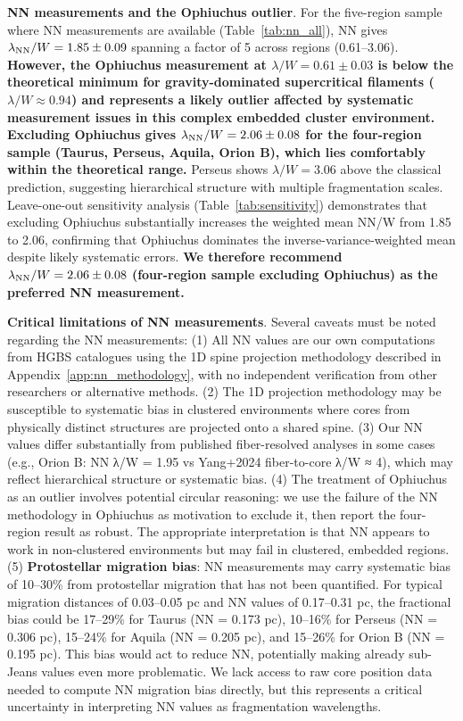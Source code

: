 \documentclass[twoside,twocolumn]{mnras}
\begin{document}
\textbf{NN measurements and the Ophiuchus outlier}. For the five-region sample where NN measurements are available (Table~\ref{tab:nn_all}), NN gives $\lambda_{\rm NN}/W = 1.85 \pm 0.09$ spanning a factor of 5 across regions (0.61--3.06). \textbf{However, the Ophiuchus measurement at $\lambda/W = 0.61 \pm 0.03$ is below the theoretical minimum for gravity-dominated supercritical filaments ($\lambda/W \approx 0.94$) and represents a likely outlier affected by systematic measurement issues in this complex embedded cluster environment. Excluding Ophiuchus gives $\lambda_{\rm NN}/W = 2.06 \pm 0.08$ for the four-region sample (Taurus, Perseus, Aquila, Orion B), which lies comfortably within the theoretical range.} Perseus shows $\lambda/W = 3.06$ above the classical prediction, suggesting hierarchical structure with multiple fragmentation scales. Leave-one-out sensitivity analysis (Table~\ref{tab:sensitivity}) demonstrates that excluding Ophiuchus substantially increases the weighted mean NN/W from 1.85 to 2.06, confirming that Ophiuchus dominates the inverse-variance-weighted mean despite likely systematic errors. \textbf{We therefore recommend $\lambda_{\rm NN}/W = 2.06 \pm 0.08$ (four-region sample excluding Ophiuchus) as the preferred NN measurement.}

\textbf{Critical limitations of NN measurements}. Several caveats must be noted regarding the NN measurements: (1) All NN values are our own computations from HGBS catalogues using the 1D spine projection methodology described in Appendix~\ref{app:nn_methodology}, with no independent verification from other researchers or alternative methods. (2) The 1D projection methodology may be susceptible to systematic bias in clustered environments where cores from physically distinct structures are projected onto a shared spine. (3) Our NN values differ substantially from published fiber-resolved analyses in some cases (e.g., Orion B: NN λ/W = 1.95 vs Yang+2024 fiber-to-core λ/W ≈ 4), which may reflect hierarchical structure or systematic bias. (4) The treatment of Ophiuchus as an outlier involves potential circular reasoning: we use the failure of the NN methodology in Ophiuchus as motivation to exclude it, then report the four-region result as robust. The appropriate interpretation is that NN appears to work in non-clustered environments but may fail in clustered, embedded regions. (5) \textbf{Protostellar migration bias}: NN measurements may carry systematic bias of 10--30\% from protostellar migration that has not been quantified. For typical migration distances of 0.03--0.05 pc \citep{Kirk2016, Mattern2018} and NN values of 0.17--0.31 pc, the fractional bias could be 17--29\% for Taurus (NN = 0.173 pc), 10--16\% for Perseus (NN = 0.306 pc), 15--24\% for Aquila (NN = 0.205 pc), and 15--26\% for Orion B (NN = 0.195 pc). This bias would act to reduce NN, potentially making already sub-Jeans values even more problematic. We lack access to raw core position data needed to compute NN migration bias directly, but this represents a critical uncertainty in interpreting NN values as fragmentation wavelengths.
\end{document}
